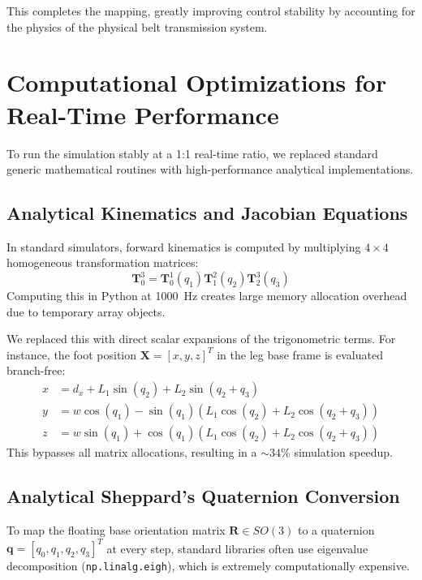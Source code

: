\documentclass[11pt,a4paper]{article}
\begin{document}
This completes the mapping, greatly improving control stability by accounting for the physics of the physical belt transmission system.

\section{Computational Optimizations for Real-Time Performance}
To run the simulation stably at a 1:1 real-time ratio, we replaced standard generic mathematical routines with high-performance analytical implementations. 

\subsection{Analytical Kinematics and Jacobian Equations}
In standard simulators, forward kinematics is computed by multiplying $4 \times 4$ homogeneous transformation matrices:
\begin{equation}
\mathbf{T}_0^3 = \mathbf{T}_0^1(q_1) \mathbf{T}_1^2(q_2) \mathbf{T}_2^3(q_3)
\end{equation}
Computing this in Python at 1000~Hz creates large memory allocation overhead due to temporary array objects. 

We replaced this with direct scalar expansions of the trigonometric terms. For instance, the foot position $\mathbf{X} = [x, y, z]^T$ in the leg base frame is evaluated branch-free:
\begin{align}
x &= d_x + L_1 \sin(q_2) + L_2 \sin(q_2 + q_3) \\
y &= w \cos(q_1) - \sin(q_1) \left( L_1 \cos(q_2) + L_2 \cos(q_2 + q_3) \right) \\
z &= w \sin(q_1) + \cos(q_1) \left( L_1 \cos(q_2) + L_2 \cos(q_2 + q_3) \right)
\end{align}
This bypasses all matrix allocations, resulting in a $\sim 34\%$ simulation speedup.

\subsection{Analytical Sheppard's Quaternion Conversion}
To map the floating base orientation matrix $\mathbf{R} \in SO(3)$ to a quaternion $\mathbf{q} = [q_0, q_1, q_2, q_3]^T$ at every step, standard libraries often use eigenvalue decomposition (\texttt{np.linalg.eigh}), which is extremely computationally expensive. 
\end{document}
